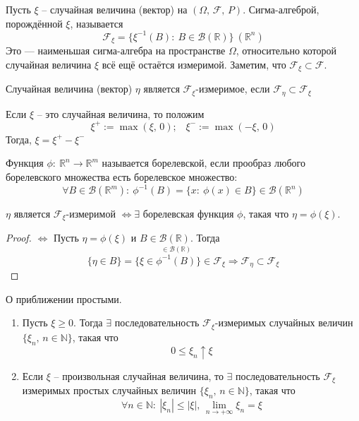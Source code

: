 \begin{definition}
	Пусть $\xi$ -- случайная величина (вектор) на $(\Omega,\, \mathcal{F},\,P)$. Сигма-алгеброй, порождённой $\xi$, называется
	\[\mathcal{F}_\xi = \{\xi^{-1}(B) :\: B \in \mathcal{B}(\mathbb{R})\} \: (\mathbb{R}^n)\]
	Это --- наименьшая сигма-алгебра на пространстве $\Omega$, относительно которой случайная величина $\xi$ всё ещё остаётся измеримой.
	Заметим, что $\mathcal{F}_\xi \subset \mathcal{F}$.
\end{definition}

\begin{definition}
	Случайная величина (вектор) $\eta$ является $\mathcal{F}_\xi$-измеримое, если $\mathcal{F}_\eta \subset \mathcal{F}_\xi$
\end{definition}

\begin{definition}
	Если $\xi$ -- это случайная величина, то положим
	\[\xi^+ := \max(\xi,\, 0);\;\;\; \xi^- := \max(-\xi,\, 0)\]
	Тогда, $\xi = \xi^+ - \xi^-$
\end{definition}

\begin{definition}
	Функция $\phi:\: \mathbb{R}^n \to \mathbb{R}^m$ называется борелевской, если прообраз любого борелевского множества есть борелевское множество:
	\[\forall B \in \mathcal{B}(\mathbb{R}^m) :\: \phi^{-1}(B) = \{x :\: \phi(x) \in B\} \in \mathcal{B}(\mathbb{R}^n)\]
\end{definition}

\begin{lemma} \label{BOREL_MEASURE}
	$\eta$ является $\mathcal{F}_\xi$-измеримой $\Leftrightarrow \exists$ борелевская функция $\phi$, такая что $\eta = \phi(\xi)$.
\end{lemma}

\begin{proof}
	$\Leftrightarrow$ Пусть $\eta = \phi(\xi)$ и $B \in \mathcal{B}(\mathbb{R})$. Тогда
	\[\{\eta \in B\} = \{\xi \in \stackrel{\in \mathcal{B}(\mathbb{R})}{\phi^{-1}(B)}\} \in \mathcal{F}_\xi \Rightarrow \mathcal{F}_\eta \subset \mathcal{F}_\xi\]
\end{proof}

\begin{theorem}
	О приближении простыми.

	\begin{enumerate}
		\item Пусть $\xi \geq 0$. Тогда $\exists$ последовательность $\mathcal{F}_\xi$-измеримых случайных величин $\{\xi_n,\, n \in \mathbb{N}\}$, такая что
		      \[0 \leq \xi_n \uparrow \xi\]
		\item Если $\xi$ -- произвольная случайная величина, то $\exists$ последовательность $\mathcal{F}_\xi$ измеримых простых случайных величин $\{\xi_n,\, n \in \mathbb{N}\}$, такая что
		      \[\forall n \in \mathbb{N}:\: |\xi_n| \leq |\xi|,\, \lim_{n \to +\infty}\xi_n = \xi\]
	\end{enumerate}
\end{theorem}

